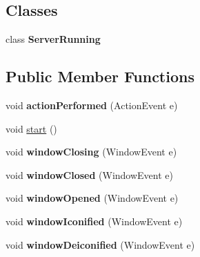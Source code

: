 \subsection*{Classes}
\begin{DoxyCompactItemize}
\item 
class {\bfseries Server\-Running}
\end{DoxyCompactItemize}
\subsection*{Public Member Functions}
\begin{DoxyCompactItemize}
\item 
\hypertarget{classgov_1_1fnal_1_1ppd_1_1dd_1_1chat_1_1MessagingServerGUI_afc6026549f5dd2a239050cc31dee565f}{void {\bfseries action\-Performed} (Action\-Event e)}\label{classgov_1_1fnal_1_1ppd_1_1dd_1_1chat_1_1MessagingServerGUI_afc6026549f5dd2a239050cc31dee565f}

\item 
void \hyperlink{classgov_1_1fnal_1_1ppd_1_1dd_1_1chat_1_1MessagingServerGUI_a22fa59dfa28c3dc01d234eff914a910f}{start} ()
\item 
\hypertarget{classgov_1_1fnal_1_1ppd_1_1dd_1_1chat_1_1MessagingServerGUI_a8c378f35d36b3e0f978675d582ab426c}{void {\bfseries window\-Closing} (Window\-Event e)}\label{classgov_1_1fnal_1_1ppd_1_1dd_1_1chat_1_1MessagingServerGUI_a8c378f35d36b3e0f978675d582ab426c}

\item 
\hypertarget{classgov_1_1fnal_1_1ppd_1_1dd_1_1chat_1_1MessagingServerGUI_a30051177bf84ba3b8bb8107672e144e5}{void {\bfseries window\-Closed} (Window\-Event e)}\label{classgov_1_1fnal_1_1ppd_1_1dd_1_1chat_1_1MessagingServerGUI_a30051177bf84ba3b8bb8107672e144e5}

\item 
\hypertarget{classgov_1_1fnal_1_1ppd_1_1dd_1_1chat_1_1MessagingServerGUI_ae92ae991433af389152dc9406042ab84}{void {\bfseries window\-Opened} (Window\-Event e)}\label{classgov_1_1fnal_1_1ppd_1_1dd_1_1chat_1_1MessagingServerGUI_ae92ae991433af389152dc9406042ab84}

\item 
\hypertarget{classgov_1_1fnal_1_1ppd_1_1dd_1_1chat_1_1MessagingServerGUI_a355d56a70306e34df0c8887b0f3786ca}{void {\bfseries window\-Iconified} (Window\-Event e)}\label{classgov_1_1fnal_1_1ppd_1_1dd_1_1chat_1_1MessagingServerGUI_a355d56a70306e34df0c8887b0f3786ca}

\item 
\hypertarget{classgov_1_1fnal_1_1ppd_1_1dd_1_1chat_1_1MessagingServerGUI_aea0f1a0225e811ef7487ff7c5c2b6d29}{void {\bfseries window\-Deiconified} (Window\-Event e)}\label{classgov_1_1fnal_1_1ppd_1_1dd_1_1chat_1_1MessagingServerGUI_aea0f1a0225e811ef7487ff7c5c2b6d29}


\end{DoxyCompactItemize}
